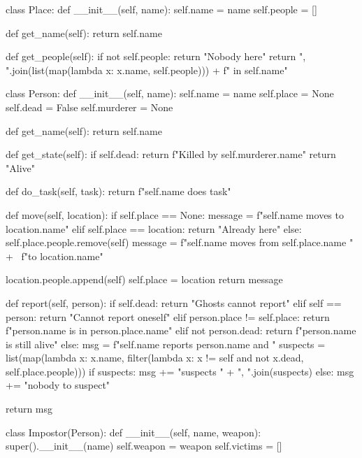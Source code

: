 \begin{python}
class Place:
    def __init__(self, name):
        self.name = name
        self.people = []

    def get_name(self):
        return self.name

    def get_people(self):
        if not self.people:
            return "Nobody here"
        return ", ".join(list(map(lambda x: x.name,
                                  self.people))) + f" in {self.name}"

class Person:
    def __init__(self, name):
        self.name = name
        self.place = None
        self.dead = False
        self.murderer = None

    def get_name(self):
        return self.name

    def get_state(self):
        if self.dead:
            return f"Killed by {self.murderer.name}"
        return "Alive"

    def do_task(self, task):
        return f"{self.name} does {task}"

    def move(self, location):
        if self.place == None:
            message = f"{self.name} moves to {location.name}"
        elif self.place == location:
            return "Already here"
        else:
            self.place.people.remove(self)
            message = f"{self.name} moves from {self.place.name} " + \
                      f"to {location.name}"

        location.people.append(self)
        self.place = location
        return message

    def report(self, person):
        if self.dead:
            return "Ghosts cannot report"
        elif self == person:
            return "Cannot report oneself"
        elif person.place != self.place:
            return f"{person.name} is in {person.place.name}"
        elif not person.dead:
            return f"{person.name} is still alive"
        else:
            msg = f"{self.name} reports {person.name} and "
            suspects = list(map(lambda x: x.name,
                                filter(lambda x: x != self and not x.dead,
                                       self.place.people)))
            if suspects:
                msg += "suspects " + ", ".join(suspects)
            else:
                msg += "nobody to suspect"

            return msg

class Impostor(Person):
    def __init__(self, name, weapon):
        super().__init__(name)
        self.weapon = weapon
        self.victims = []


\end{python}
